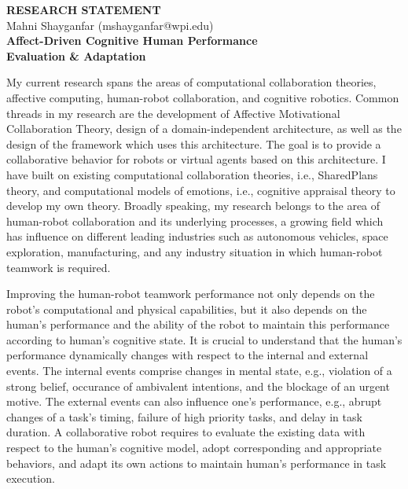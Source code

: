 \documentclass[a4paper, 11pt]{article}
\begin{document}
\thispagestyle{fancy}

\lhead{}
\rhead{}

\renewcommand{\headrulewidth}{0pt} 
\renewcommand{\footrulewidth}{0pt} 

\pagestyle{fancy}

\rhead{\textcolor{gray}{\thepage/\totalpages{}}}

\begin{small}

\begin{center}
{\LARGE \bf RESEARCH STATEMENT}\\
\vspace*{0.1cm}
{\normalsize Mahni Shayganfar (mshayganfar@wpi.edu)}
\vspace{6mm}\\
{\Large \bf Affect-Driven Cognitive Human Performance \\Evaluation \&
Adaptation}\\
\end{center}

My current research spans the areas of computational collaboration theories,
affective computing, human-robot collaboration, and cognitive robotics. Common
threads in my research are the development of Affective Motivational
Collaboration Theory, design of a domain-independent architecture, as well as
the design of the framework which uses this architecture. The goal is to provide
a collaborative behavior for robots or virtual agents based on this
architecture. I have built on existing computational collaboration theories,
i.e., SharedPlans theory, and computational models of emotions, i.e., cognitive
appraisal theory to develop my own theory. Broadly speaking, my research belongs
to the area of human-robot collaboration and its underlying processes, a growing
field which has influence on different leading industries such as autonomous
vehicles, space exploration, manufacturing, and any industry situation in which
human-robot teamwork is required.

Improving the human-robot teamwork performance not only depends on the robot's
computational and physical capabilities, but it also depends on the human's
performance and the ability of the robot to maintain this performance according
to human's cognitive state. It is crucial to understand that the human's
performance dynamically changes with respect to the internal and external
events. The internal events comprise changes in mental state, e.g., violation of
a strong belief, occurance of ambivalent intentions, and the blockage of an
urgent motive. The external events can also influence one's performance, e.g.,
abrupt changes of a task's timing, failure of high priority tasks, and delay in
task duration. A collaborative robot requires to evaluate the existing data with
respect to the human's cognitive model, adopt corresponding and appropriate
behaviors, and adapt its own actions to maintain human's performance in task
execution.


\end{small}
\end{document}
